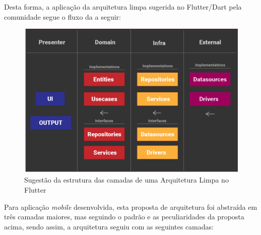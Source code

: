  Desta forma, a aplicação da arquitetura limpa sugerida no Flutter/Dart pela comunidade \cite{flutterando_clean_dart} segue o fluxo da  a seguir:

\begin{figure}[H]
\centering
  \includegraphics[width=0.8\columnwidth]{images/clean_dart2.png}
  \caption{Sugestão da estrutura das camadas de uma Arquitetura Limpa no Flutter}
  \label{fig:clean_dart2}
\end{figure}

Para aplicação \textit{mobile} desenvolvida, esta proposta de arquitetura foi abstraída em três camadas maiores, mas seguindo o padrão e as peculiaridades da proposta acima, sendo assim, a arquitetura seguiu com as seguintes camadas:

